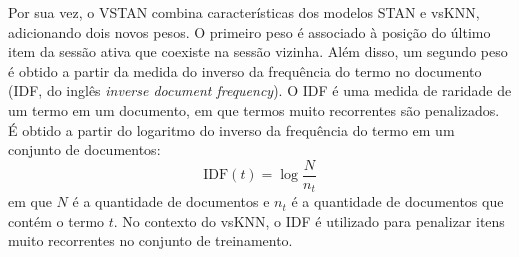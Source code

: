 Por sua vez, o VSTAN combina características dos modelos STAN e vsKNN,
adicionando dois novos pesos. O primeiro peso é associado à posição do último
item da sessão ativa que coexiste na sessão vizinha. Além disso, um segundo peso
é obtido a partir da medida do inverso da frequência do termo no documento (IDF,
do inglês \textit{inverse document frequency}). O IDF é uma medida de raridade
de um termo em um documento, em que termos muito recorrentes são penalizados.
É obtido a partir do logaritmo do inverso da frequência do termo em um
conjunto de documentos:
\begin{equation}
    \text{IDF}(t) = \log \frac{N}{n_t}
\end{equation}
em que $N$ é a quantidade de documentos e $n_t$ é a quantidade de documentos
que contém o termo $t$. No contexto do vsKNN, o IDF é utilizado para penalizar
itens muito recorrentes no conjunto de treinamento.
